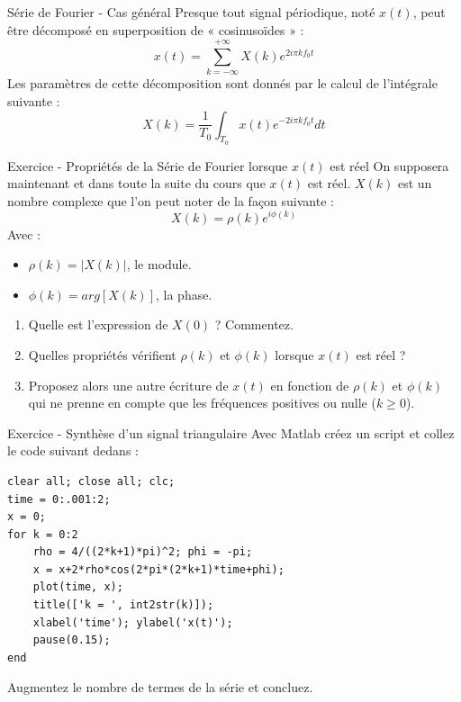 \documentclass[a4paper,11pt]{beamer}
\newcounter{exampleBlockCounter}
\begin{document}
\begin{frame}
\begin{block}{Série de Fourier - Cas général}
\justify
Presque tout signal périodique, noté $x(t)$, peut être décomposé en
superposition de « cosinusoïdes » :
$$x(t) = \sum_{k=-\infty}^{+\infty}X(k)e^{2i\pi kf_0 t}$$ 
\justify
Les paramètres de cette décomposition sont donnés par le calcul de l'intégrale
suivante :
$$X(k) = \frac{1}{T_0}\int_{T_0} x(t)e^{-2i\pi kf_0 t}dt$$
\end{block}
\end{frame}

\begin{frame}
\begin{exampleblock}{Exercice  - Propriétés de la
Série de Fourier lorsque $x(t)$ est réel}
\justifying
On supposera maintenant et dans toute la suite du cours que $x(t)$ est réel.
$X(k)$ est un nombre complexe que l'on peut noter de la façon suivante :
$$
X(k) = \rho(k) e^{i\phi(k)}
$$ 
Avec :
\begin{itemize}[label=$\bullet$]
  \item $\rho(k) = \lvert X(k) \rvert$, le module.
  \item $\phi(k) = arg[X(k)]$, la phase.
\end{itemize}
\begin{enumerate}
  \item Quelle est l'expression de $X(0)$ ? Commentez.
  \item Quelles propriétés vérifient $\rho(k)$ et $\phi(k)$ lorsque $x(t)$ est
  réel ?
  \item Proposez alors une autre écriture de $x(t)$ en fonction de $\rho(k)$ et
  $\phi(k)$ qui ne prenne en compte que les fréquences positives ou nulle
  ($k\geq 0$).
\end{enumerate}
  
\end{exampleblock}
\end{frame}

\begin{frame}[containsverbatim]
\begin{exampleblock}{Exercice
 - Synthèse d'un
signal triangulaire} Avec Matlab créez un
script et collez le code suivant dedans :
\begin{lstlisting}[style=Matlab-editor]
clear all; close all; clc;
time = 0:.001:2;
x = 0;
for k = 0:2
    rho = 4/((2*k+1)*pi)^2; phi = -pi; 
    x = x+2*rho*cos(2*pi*(2*k+1)*time+phi);    
    plot(time, x);
    title(['k = ', int2str(k)]);
    xlabel('time'); ylabel('x(t)');
    pause(0.15);
end
\end{lstlisting}
Augmentez le nombre de termes de la série et concluez.
\end{exampleblock}
\end{frame}
\end{document}
